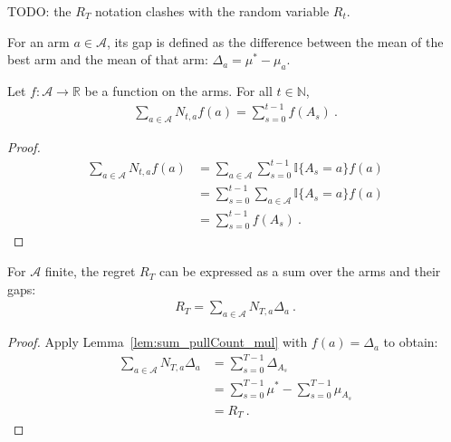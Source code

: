 TODO: the $R_T$ notation clashes with the random variable $R_t$.

\begin{definition}\label{def:gap}
  \leanok
For an arm $a \in \mathcal{A}$, its gap is defined as the difference between the mean of the best arm and the mean of that arm: $\Delta_a = \mu^* - \mu_a$.
\end{definition}


\begin{lemma}\label{lem:sum_pullCount_mul}
  \leanok
Let $f : \mathcal{A} \to \mathbb{R}$ be a function on the arms. For all $t \in \mathbb{N}$,
\begin{align*}
  \sum_{a \in \mathcal{A}} N_{t,a} f(a) = \sum_{s=0}^{t-1} f(A_s) \: .
\end{align*}
\end{lemma}

\begin{proof}\leanok
\begin{align*}
  \sum_{a \in \mathcal{A}} N_{t,a} f(a)
  &= \sum_{a \in \mathcal{A}} \sum_{s=0}^{t-1} \mathbb{I}\{A_s = a\} f(a)
  \\
  &= \sum_{s=0}^{t-1} \sum_{a \in \mathcal{A}} \mathbb{I}\{A_s = a\} f(a)
  \\
  &= \sum_{s=0}^{t-1} f(A_s)
  \: .
\end{align*}
\end{proof}


\begin{lemma}\label{lem:regret_eq_sum_pullCount_mul_gap}
  \leanok
For $\mathcal{A}$ finite, the regret $R_T$ can be expressed as a sum over the arms and their gaps:
\begin{align*}
  R_T = \sum_{a \in \mathcal{A}} N_{T,a} \Delta_a \: .
\end{align*}
\end{lemma}

\begin{proof}\leanok
Apply Lemma~\ref{lem:sum_pullCount_mul} with $f(a) = \Delta_a$ to obtain:
\begin{align*}
  \sum_{a \in \mathcal{A}} N_{T,a} \Delta_a
  &= \sum_{s=0}^{T-1} \Delta_{A_s}
  \\
  &= \sum_{s=0}^{T-1} \mu^* - \sum_{s=0}^{T-1} \mu_{A_s}
  \\
  &= R_T
  \: .
\end{align*}
\end{proof}


